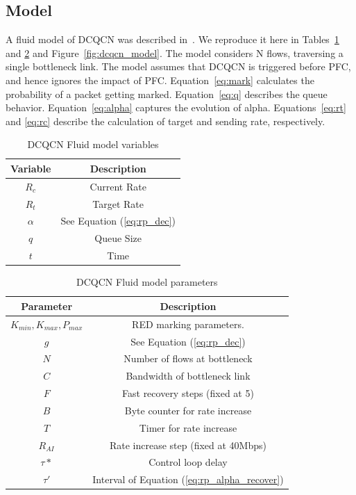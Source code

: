 \subsection{Model}

A fluid model of DCQCN was described in~\cite{dcqcn}. We reproduce it here in
Tables~\ref{tab:dcqcn_var} and \ref{tab:dcqcn_param} and
Figure~\ref{fig:dcqcn_model}.  The model considers N flows, traversing a single
bottleneck link. The model assumes that DCQCN is triggered before PFC, and hence
ignores the impact of PFC. Equation~\ref{eq:mark} calculates the probability of
a packet getting marked.  Equation~\ref{eq:q} describes the queue behavior.
Equation~\ref{eq:alpha} captures the evolution of alpha.  Equations~\ref{eq:rt}
and \ref{eq:rc} describe the calculation of target and sending rate,
respectively. 
\begin{table}[t]
\center
{
\footnotesize
{
\begin{tabular}{|c|c|} \hline
Variable & Description \\ \hline
$R_c$ & Current Rate \\ \hline
$R_t$ & Target Rate \\ \hline
$\alpha$ & See Equation (\ref{eq:rp_dec}) \\ \hline
$q$ & Queue Size \\ \hline
$t$ & Time \\ \hline
\end{tabular}
}
}
\caption{DCQCN Fluid model variables}
\label{tab:dcqcn_var}
\end{table}
\begin{table}[t]
\center
{
\footnotesize
{
\begin{tabular}{|c|c|} \hline
Parameter & Description \\ \hline
$K_{min}, K_{max}, P_{max}$ & RED marking parameters. \\ \hline
$g$ & See Equation (\ref{eq:rp_dec}) \\ \hline
$N$ & Number of flows at bottleneck\\ \hline
$C$ & Bandwidth of bottleneck link\\ \hline
$F$ & Fast recovery steps (fixed at 5) \\ \hline
$B$ & Byte counter for rate increase\\ \hline
$T$ & Timer for rate increase\\ \hline
$R_{AI}$ & Rate increase step (fixed at 40Mbps)\\ \hline
$\tau *$ & Control loop delay \\ \hline
$\tau '$ & Interval of Equation (\ref{eq:rp_alpha_recover})\\ \hline
\end{tabular}
}
}
\caption{DCQCN Fluid model parameters}
\label{tab:dcqcn_param}
\end{table}
